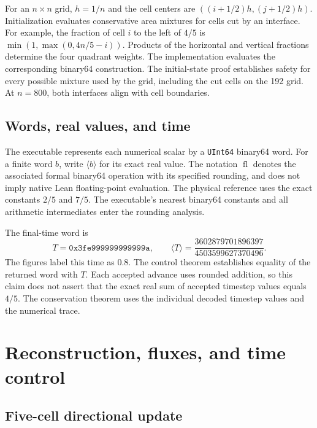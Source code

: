 \documentclass[11pt]{article}
\newcommand{\code}[1]{\texttt{#1}}
\newcommand{\val}[1]{\langle #1\rangle}
\newcommand{\fl}{\operatorname{fl}}
\begin{document}
For an $n\times n$ grid, $h=1/n$ and the cell centers are $((i+1/2)h,(j+1/2)h)$.  Initialization evaluates conservative area mixtures for cells cut by an interface.  For example, the fraction of cell $i$ to the left of $4/5$ is $\min(1,\max(0,4n/5-i))$.  Products of the horizontal and vertical fractions determine the four quadrant weights.  The implementation evaluates the corresponding binary64 construction.  The initial-state proof establishes safety for every possible mixture used by the grid, including the cut cells on the 192 grid.  At $n=800$, both interfaces align with cell boundaries.

\subsection{Words, real values, and time}

The executable represents each numerical scalar by a \code{UInt64} binary64 word.  For a finite word $b$, write $\val{b}$ for its exact real value.  The notation $\fl$ denotes the associated formal binary64 operation with its specified rounding, and does not imply native Lean floating-point evaluation.  The physical reference uses the exact constants $2/5$ and $7/5$.  The executable's nearest binary64 constants and all arithmetic intermediates enter the rounding analysis.

The final-time word is
\begin{equation}
T=\code{0x3fe999999999999a},\qquad
\val{T}=\frac{3602879701896397}{4503599627370496}.
\end{equation}
The figures label this time as $0.8$.  The control theorem establishes equality of the returned word with $T$.  Each accepted advance uses rounded addition, so this claim does not assert that the exact real sum of accepted timestep values equals $4/5$.  The conservation theorem uses the individual decoded timestep values and the numerical trace.

\section{Reconstruction, fluxes, and time control}

\subsection{Five-cell directional update}
\end{document}
